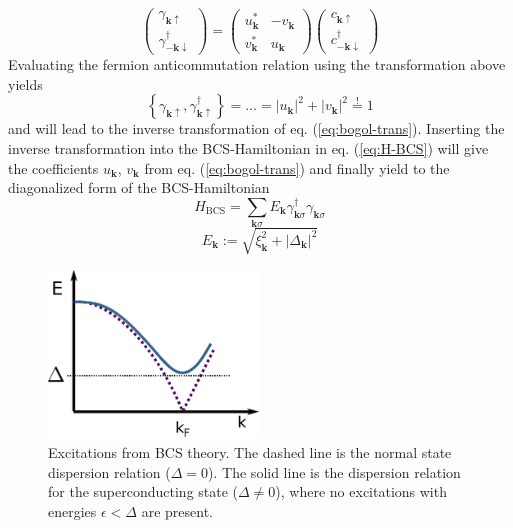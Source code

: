 \begin{equation}
\begin{pmatrix}
\gamma_{\mathbf{k} \uparrow} \\ \gamma^{\dagger}_{-\mathbf{k} \downarrow}  
\end{pmatrix} = \begin{pmatrix}
u^*_{\mathbf{k} } & -v_{\mathbf{k} } \\
v^*_{\mathbf{k} }  & u_{\mathbf{k} } 
\end{pmatrix} 
\begin{pmatrix}
c_{\mathbf{k} \uparrow} \\ c^{\dagger}_{-\mathbf{k} \downarrow}  
\end{pmatrix}
\end{equation}\label{eq:bogol-trans}
Evaluating the fermion anticommutation relation using the transformation above yields
\begin{equation}
\left\{ \gamma_{\mathbf{k} \uparrow}, \gamma^{\dagger}_{\mathbf{k} \uparrow}  \right\}  = \dots = |u_{\mathbf{k}}|^2  + |v_{\mathbf{k}}|^2 \stackrel{!}{=} 1
\end{equation}
and will lead to the inverse transformation of eq. (\ref{eq:bogol-trans}). Inserting the inverse transformation into the BCS-Hamiltonian in eq. (\ref{eq:H-BCS}) will give the coefficients $u_{\mathbf{k}}$, $v_{\mathbf{k}}$ from eq. (\ref{eq:bogol-trans}) and finally yield to the diagonalized form of the BCS-Hamiltonian
\begin{equation}
H_{\text{BCS}} =  \sum_{ \mathbf{k} \sigma } E_{ \mathbf{k} } \gamma^{\dagger}_{\mathbf{k} \sigma } \gamma_{\mathbf{k} \sigma }
\end{equation}
\begin{equation}
E_{\mathbf{k}} :=  \sqrt{\xi^2_{\mathbf{k}}  + |\Delta_{\mathbf{k}}|^2 } \label{eq:E-k}
\end{equation}
\begin{figure}
\centering
\includegraphics[width=0.5\textwidth]{figure/framework-analytical/bcs-spectrum}
\caption{Excitations from BCS theory. The dashed line is the normal state dispersion relation ($\Delta = 0$). The solid line is the dispersion relation for the superconducting state ($\Delta \neq 0$), where no excitations with energies $\epsilon < \Delta$ are present. } \label{fig:bcs-spectrum}
\end{figure}
